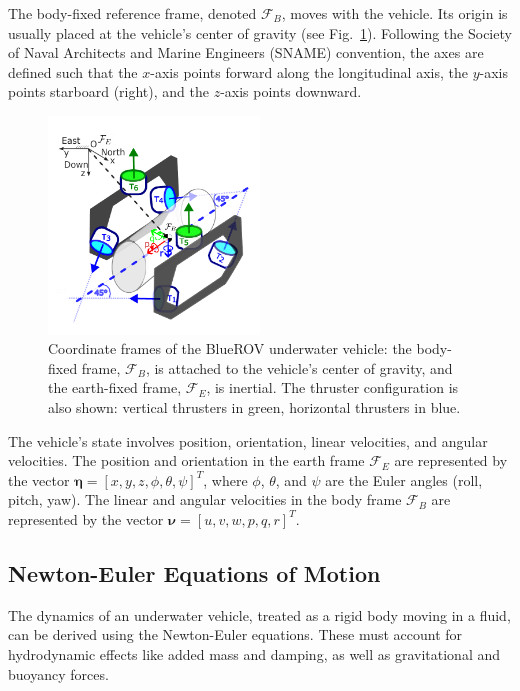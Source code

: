 The body-fixed reference frame, denoted $\mathcal{F}_B$, moves with the vehicle. Its origin is usually placed at the vehicle's center of gravity (see Fig.~\ref{fig:coordinate_frame_brov}). Following the Society of Naval Architects and Marine Engineers (SNAME) convention, the axes are defined such that the $x$-axis points forward along the longitudinal axis, the $y$-axis points starboard (right), and the $z$-axis points downward.

\begin{figure}[h!] %
    \centering
    \includegraphics[width=0.5\textwidth]{Phd_thesis/chapters/1.Introduction/figures/brov4.pdf} %
    \caption{Coordinate frames of the BlueROV underwater vehicle: the body-fixed frame, $\mathcal{F}_B$, is attached to the vehicle’s center of gravity, and the earth-fixed frame, $\mathcal{F}_E$, is inertial. The thruster configuration is also shown: vertical thrusters in green, horizontal thrusters in blue.}
    \label{fig:coordinate_frame_brov}
\end{figure}

The vehicle's state involves position, orientation, linear velocities, and angular velocities. The position and orientation in the earth frame $\mathcal{F}_E$ are represented by the vector $\boldsymbol{\eta} = [x, y, z, \phi, \theta, \psi]^T$, where $\phi$, $\theta$, and $\psi$ are the Euler angles (roll, pitch, yaw). The linear and angular velocities in the body frame $\mathcal{F}_B$ are represented by the vector $\boldsymbol{\nu} = [u, v, w, p, q, r]^T$.

\subsection{Newton-Euler Equations of Motion}
The dynamics of an underwater vehicle, treated as a rigid body moving in a fluid, can be derived using the Newton-Euler equations. These must account for hydrodynamic effects like added mass and damping, as well as gravitational and buoyancy forces.


